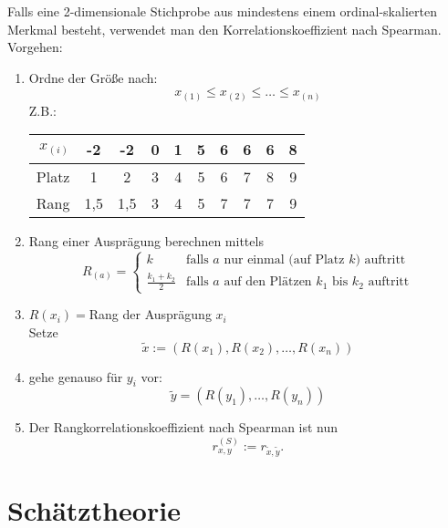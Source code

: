 Falls eine 2-dimensionale Stichprobe aus mindestens einem ordinal-skalierten Merkmal besteht, verwendet man den Korrelationskoeffizient nach Spearman.\\
Vorgehen:
\begin{enumerate}
\item Ordne der Größe nach:
$$x_{(1)}\leq x_{(2)} \leq \ldots \leq x_{(n)}$$
Z.B.:\\
\begin{tabular}{r | c c c c c c c c c}
$x_{(i)}$ & -2 & -2 & 0 & 1 &  5 & 6 &6 &6 &8\\\hline
Platz & 1 & 2 & 3 &4 &5 & 6 & 7 &8 &9\\
Rang & 1,5 & 1,5& 3 &4 &5 &7 &7 &7 &9
\end{tabular}
\item Rang einer Ausprägung berechnen mittels
$$R_(a) = \begin{cases}
k & \text{falls }a\text{ nur einmal (auf Platz }k\text{) auftritt}\\
\frac{k_1+k_2}{2} & \text{falls }a\text{ auf den Plätzen }k_1\text{ bis }k_2\text{ auftritt}
\end{cases}$$
\item $R(x_i)=$Rang der Ausprägung $x_i$\\
Setze $$\tilde{x}:= (R(x_1),R(x_2), \ldots, R(x_n))$$
\item gehe genauso für $y_i$ vor:
$$\tilde{y}=(R(y_1),\ldots, R(y_n))$$
\item Der Rangkorrelationskoeffizient nach Spearman ist nun
$$r_{x,y}^{(S)} := r_{\tilde{x},\tilde{y}}\text{.}$$
\end{enumerate}

\section{Schätztheorie}

